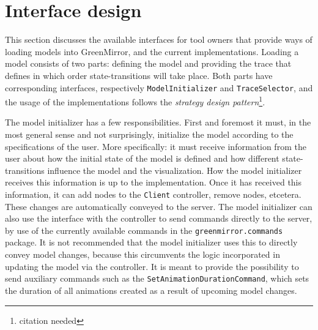 \documentclass[a4paper]{article}
\begin{document}
	
	
	
	
	
	
	
	
	
	\section{Interface design}\label{sec:interfacedesign}
	This section discusses the available interfaces for tool owners that provide ways of loading models into GreenMirror, and the current implementations. Loading a model consists of two parts: defining the model and providing the trace that defines in which order state-transitions will take place. Both parts have corresponding interfaces, respectively \lstinline{ModelInitializer} and \lstinline{TraceSelector}, and the usage of the implementations follows the \emph{strategy design pattern}\footnote{citation needed}.
	
	The model initializer has a few responsibilities. First and foremost it must, in the most general sense and not surprisingly, initialize the model according to the specifications of the user. More specifically: it must receive information from the user about how the initial state of the model is defined and how different state-transitions influence the model and the visualization. How the model initializer receives this information is up to the implementation. Once it has received this information, it can add nodes to the \lstinline{Client} controller, remove nodes, etcetera. These changes are automatically conveyed to the server. The model initializer can also use the interface with the controller to send commands directly to the server, by use of the currently available commands in the \lstinline{greenmirror.commands} package. It is not recommended that the model initializer uses this to directly convey model changes, because this circumvents the logic incorporated in updating the model via the controller. It is meant to provide the possibility to send auxiliary commands such as the \lstinline{SetAnimationDurationCommand}, which sets the duration of all animations created as a result of upcoming model changes.
	
\end{document}
